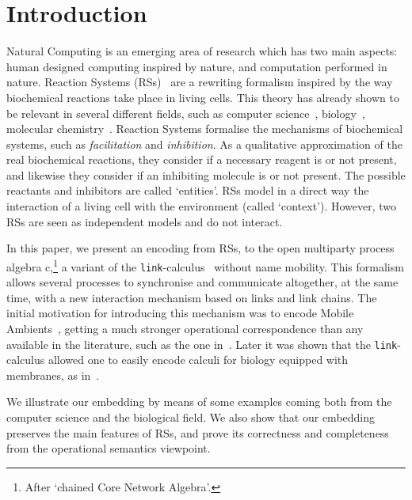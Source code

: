 
\section{Introduction}

Natural Computing is an emerging area of research which has two main 
aspects: human designed computing inspired by nature, and computation 
performed in nature. Reaction Systems (RSs)~\cite{BEMR11} are 
a rewriting formalism
inspired by the way biochemical reactions take place in living 
cells.  
This theory has already shown to be relevant in several different 
fields, such as computer science~\cite{MPR15}, 
biology~\cite{ABP14,CMMBM12,Az17,BarbutiGLM16}, 
molecular chemistry~\cite{OY16}.
Reaction Systems formalise the mechanisms of biochemical systems, 
such as {\em facilitation} and {\em inhibition}. 
As a qualitative approximation of the real biochemical reactions, they
consider if a necessary reagent is or not present, and likewise they
consider if an inhibiting molecule is or not present. 
The  possible reactants and inhibitors are called `entities'.
RSs model in a direct way the interaction of a living cell
with the environment (called `context'). However, two RSs are seen
as independent models and do not interact.


In this paper, we present an encoding from RSs, 
to the open multiparty process algebra c\CNA,\footnote{After `chained Core Network 
Algebra'.} a variant of the {\tt link}-calculus~\cite{BodeiBB12,BBB17} without name mobility.
This formalism allows several processes to synchronise and 
communicate altogether, at the same time, with a new interaction
mechanism based on links and link chains. 
The initial motivation for introducing this mechanism was to encode
Mobile Ambients~\cite{CardelliG00}, getting a much stronger operational
correspondence than any available in the literature, such as the one in~\cite{B16}.
Later it was shown that the {\tt link}-calculus allowed one to easily encode calculi for biology equipped with membranes, as in~\cite{BodeiBBC14}.

We illustrate our embedding by means of some examples coming
both from the computer science and the biological field.
We also show that our embedding preserves the main
features of RSs, and prove its correctness and completeness
from the operational semantics viewpoint.

